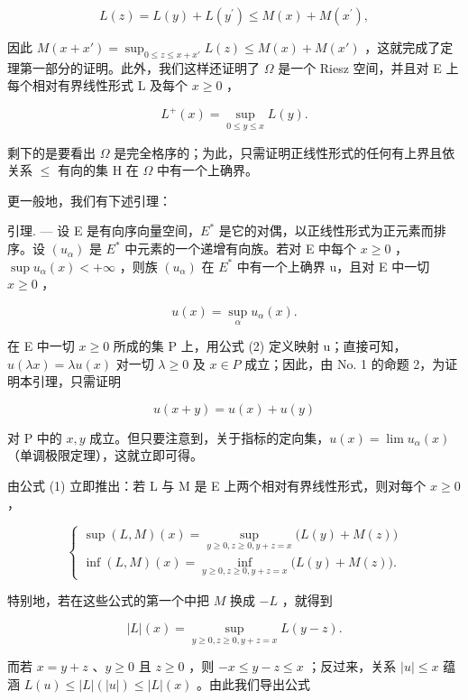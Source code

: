 \[
L (z) = L (y) + L \left(y ^ {\prime}\right) \leqslant M (x) + M \left(x ^ {\prime}\right),
\]

因此 \(M(x + x') = \sup_{0 \leqslant z \leqslant x + x'} L(z) \leqslant M(x) + M(x')\) ，这就完成了定理第一部分的证明。此外，我们这样还证明了 \(\Omega\) 是一个 Riesz 空间，并且对 E 上每个相对有界线性形式 L 及每个 \(x \geqslant 0\) ，

\[
L ^ {+} (x) = \sup _ {0 \leqslant y \leqslant x} L (y).\tag{1}
\]

剩下的是要看出 \(\Omega\) 是完全格序的；为此，只需证明正线性形式的任何有上界且依关系 \(\leqslant\) 有向的集 H 在 \(\Omega\) 中有一个上确界。

更一般地，我们有下述引理：

引理. --- 设 E 是有向序向量空间，\(E^{*}\) 是它的对偶，以正线性形式为正元素而排序。设 \((u_{\alpha})\) 是 \(E^{*}\) 中元素的一个递增有向族。若对 E 中每个 \(x \geqslant 0\) ，\(\sup u_{\alpha}(x) < +\infty\) ，则族 \((u_{\alpha})\) 在 \(E^{*}\) 中有一个上确界 u，且对 E 中一切 \(x \geqslant 0\) ，

\[
u (x) = \sup _ {\alpha} u _ {\alpha} (x).\tag{2}
\]

在 E 中一切 \(x \geqslant 0\) 所成的集 P 上，用公式 (2) 定义映射 u；直接可知，\(u(\lambda x) = \lambda u(x)\) 对一切 \(\lambda \geqslant 0\) 及 \(x \in P\) 成立；因此，由 No. 1 的命题 2，为证明本引理，只需证明

\[
u (x + y) = u (x) + u (y)
\]

对 P 中的 \(x, y\) 成立。但只要注意到，关于指标的定向集，\(u(x) = \lim u_{\alpha}(x)\) （单调极限定理），这就立即可得。

由公式 (1) 立即推出：若 L 与 M 是 E 上两个相对有界线性形式，则对每个 \(x \geqslant 0\) ，

\[
\left\{ \begin{array}{l} \sup (L, M) (x) = \sup _ {y \geqslant 0,   z \geqslant 0,   y + z = x} \big (L (y) + M (z) \big) \\ \inf (L, M) (x) = \inf _ {y \geqslant 0,   z \geqslant 0,   y + z = x} \big (L (y) + M (z) \big). \end{array} \right.\tag{3}
\]

特别地，若在这些公式的第一个中把 \(M\) 换成 \(-L\) ，就得到

\[
| L | (x) = \sup _ {y \geqslant 0, z \geqslant 0, y + z = x} L (y - z).
\]

而若 \(x = y + z\) 、\(y \geqslant 0\) 且 \(z \geqslant 0\) ，则 \(-x \leqslant y - z \leqslant x\) ；反过来，关系 \(|u| \leqslant x\) 蕴涵 \(L(u) \leqslant |L|(|u|) \leqslant |L|(x)\) 。由此我们导出公式

